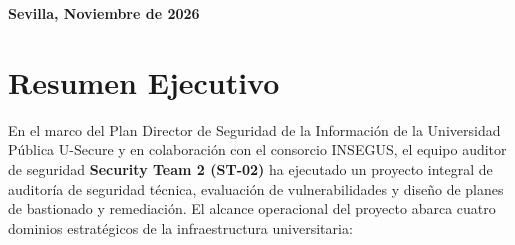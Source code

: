 \documentclass[11pt,a4paper]{article}
\begin{document}
\begin{titlepage}
    \vfill
    
    {\large\bfseries\color{darkgray} Sevilla, Noviembre de 2026}
\end{titlepage}

\tableofcontents
\newpage

\section{Resumen Ejecutivo}

En el marco del Plan Director de Seguridad de la Información de la Universidad Pública U-Secure y en colaboración con el consorcio INSEGUS, el equipo auditor de seguridad \textbf{Security Team 2 (ST-02)} ha ejecutado un proyecto integral de auditoría de seguridad técnica, evaluación de vulnerabilidades y diseño de planes de bastionado y remediación. El alcance operacional del proyecto abarca cuatro dominios estratégicos de la infraestructura universitaria:
\end{document}
